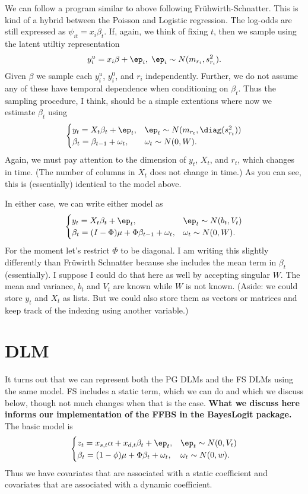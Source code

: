 \documentclass{article}
\begin{document}
We can follow a program similar to above following Fr\"{u}hwirth-Schnatter.
This is kind of a hybrid between the Poisson and Logistic regression.  The
log-odds are still expressed as $\psi_{it} = x_i \beta_t$.  If, again, we think
of fixing $t$, then we sample using the latent utiltiy representation
\[
y_{i}^u = x_i \beta + \ep_{i}, \; \ep_i \sim N(m_{r_i}, s_{r_i}^2).
\]
Given $\beta$ we sample each $y_i^u$, $y_{i}^0$, and $r_i$ independently.
Further, we do not assume any of these have temporal dependence when
conditioning on $\beta_t$.  Thus the sampling procedure, I think, should be a
simple extentions where now we estimate $\beta_t$ using
\[
\begin{cases}
y_t = X_t \beta_t + \ep_t, & \ep_t \sim N(m_{r_t}, \diag(s_{r_t}^2)) \\
\beta_t = \beta_{t-1} + \omega_t, & \omega_t \sim N(0, W).
\end{cases}
\]
Again, we must pay attention to the dimension of $y_t$, $X_t$, and $r_t$, which
changes in time.  (The number of columns in $X_t$ does not change in time.)  As
you can see, this is (essentially) identical to the model above.

In either case, we can write either model as
\[
\begin{cases}
y_t = X_t \beta_t + \ep_t, & \ep_t \sim N(b_t, V_t) \\
\beta_t = (I-\Phi)\mu + \Phi \beta_{t-1} + \omega_t, & \omega_t \sim N(0, W).
\end{cases}
\]
For the moment let's restrict $\Phi$ to be diagonal.  I am writing this slightly
differently than Fr\"{u}wirth Schnatter because she includes the mean term in
$\beta_t$ (essentially).  I suppose I could do that here as well by accepting
singular $W$.  The mean and variance, $b_t$ and $V_t$ are known while $W$ is not
known.  (Aside: we could store $y_t$ and $X_t$ as lists.  But we could also
store them as vectors or matrices and keep track of the indexing using another
variable.)

\section{DLM}

It turns out that we can represent both the PG DLMs and the FS DLMs using the
same model.  FS includes a static term, which we can do and which we discuss
below, though not much changes when that is the case.  \textbf{What we discuss
  here informs our implementation of the FFBS in the BayesLogit package.}  The
basic model is
\[
\begin{cases}
z_t = x_{s,t} \alpha + x_{d,t} \beta_t + \ep_t, & \ep_t \sim N(0, V_t) \\
\beta_t = (1-\phi) \mu + \Phi \beta_t + \omega_t, & \omega_t \sim N(0, w).
\end{cases}
\]
Thus we have covariates that are associated with a static coefficient and
covariates that are associated with a dynamic coefficient. 
\end{document}
